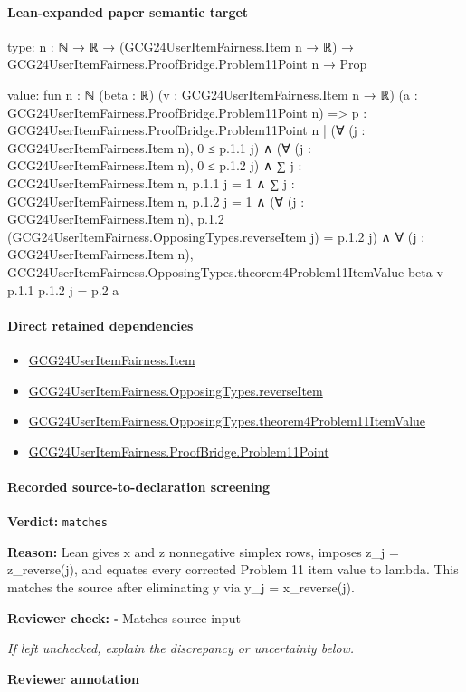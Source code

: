 \documentclass[10pt]{article}
\newcommand{\reviewerbox}{%
  \par\noindent\fbox{\parbox{0.96\linewidth}{\rule{0pt}{0.38in}}}\par
}
\newcommand{\reviewmatch}[1]{%
  \par\noindent\textbf{Reviewer check:} $\square$\; #1\par
  \noindent\emph{If left unchecked, explain the discrepancy or uncertainty below.}\par
}
\begin{document}
\paragraph{Lean-expanded paper semantic target}
\begin{ReviewVerbatim}
type:
{n : ℕ} → ℝ → (GCG24UserItemFairness.Item n → ℝ) → GCG24UserItemFairness.ProofBridge.Problem11Point n → Prop

value:
fun {n : ℕ} (beta : ℝ) (v : GCG24UserItemFairness.Item n → ℝ)
    (a : GCG24UserItemFairness.ProofBridge.Problem11Point n) =>
  {p : GCG24UserItemFairness.ProofBridge.Problem11Point n |
      (∀ (j : GCG24UserItemFairness.Item n), 0 ≤ p.1.1 j) ∧
        (∀ (j : GCG24UserItemFairness.Item n), 0 ≤ p.1.2 j) ∧
          ∑ j : GCG24UserItemFairness.Item n, p.1.1 j = 1 ∧
            ∑ j : GCG24UserItemFairness.Item n, p.1.2 j = 1 ∧
              (∀ (j : GCG24UserItemFairness.Item n),
                  p.1.2 (GCG24UserItemFairness.OpposingTypes.reverseItem j) = p.1.2 j) ∧
                ∀ (j : GCG24UserItemFairness.Item n),
                  GCG24UserItemFairness.OpposingTypes.theorem4Problem11ItemValue beta v p.1.1 p.1.2 j = p.2}
    a
\end{ReviewVerbatim}

\paragraph{Direct retained dependencies}
\begin{itemize}\raggedright
\item \hyperlink{governing-declaration-a7c560a429c6e204}{GCG24\allowbreak{}User\allowbreak{}Item\allowbreak{}Fairness.\allowbreak{}Item}
\item \hyperlink{governing-declaration-c12a8e29d370ae70}{GCG24\allowbreak{}User\allowbreak{}Item\allowbreak{}Fairness.\allowbreak{}Opposing\allowbreak{}Types.\allowbreak{}reverse\allowbreak{}Item}
\item \hyperlink{governing-declaration-714f1a6658e06590}{GCG24\allowbreak{}User\allowbreak{}Item\allowbreak{}Fairness.\allowbreak{}Opposing\allowbreak{}Types.\allowbreak{}theorem4\allowbreak{}Problem11\allowbreak{}Item\allowbreak{}Value}
\item \hyperlink{governing-declaration-8b11989793a90bbb}{GCG24\allowbreak{}User\allowbreak{}Item\allowbreak{}Fairness.\allowbreak{}Proof\allowbreak{}Bridge.\allowbreak{}Problem11\allowbreak{}Point}
\end{itemize}
\paragraph{Recorded source-to-declaration screening}
\textbf{Verdict:} \texttt{matches}
\\
{\raggedright
\textbf{Reason:} Lean gives x and z nonnegative simplex rows, imposes z\_\allowbreak{}j = z\_\allowbreak{}reverse(j), and equates every corrected Problem 11 item value to lambda.\allowbreak{} This matches the source after eliminating y via y\_\allowbreak{}j = x\_\allowbreak{}reverse(j).\allowbreak{}
\par}
\reviewmatch{Matches source input}
\noindent\textbf{Reviewer annotation}\par
\reviewerbox
\clearpage
\hypertarget{paper-prerequisite-2cefb4a6370a37cb}{}
\end{document}
